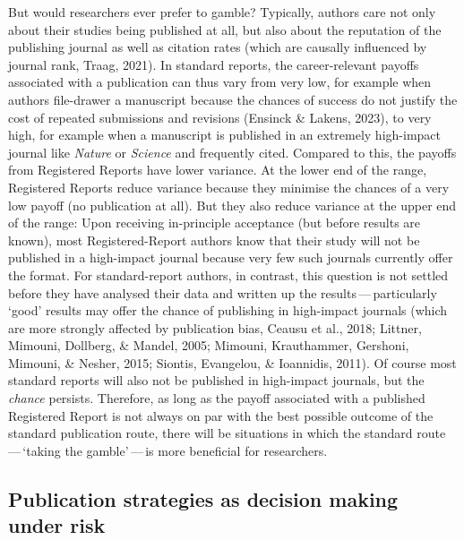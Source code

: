 \documentclass[
  ,man,mask,floatsintext]{apa6}
\begin{document}
But would researchers ever prefer to gamble?
Typically, authors care not only about their studies being published at all, but also about the reputation of the publishing journal as well as citation rates (which are causally influenced by journal rank, Traag, 2021).
In standard reports, the career-relevant payoffs associated with a publication can thus vary from very low, for example when authors file-drawer a manuscript because the chances of success do not justify the cost of repeated submissions and revisions (Ensinck \& Lakens, 2023),
to very high, for example when a manuscript is published in an extremely high-impact journal like \emph{Nature} or \emph{Science} and frequently cited.
Compared to this, the payoffs from Registered Reports have lower variance.
At the lower end of the range, Registered Reports reduce variance because they minimise the chances of a very low payoff (no publication at all).
But they also reduce variance at the upper end of the range:
Upon receiving in-principle acceptance (but before results are known), most Registered-Report authors know that their study will not be published in a high-impact journal because very few such journals currently offer the format.
For standard-report authors, in contrast, this question is not settled before they have analysed their data and written up the results\(\,\)---\(\,\)particularly `good' results may offer the chance of publishing in high-impact journals (which are more strongly affected by publication bias, Ceausu et al., 2018; Littner, Mimouni, Dollberg, \& Mandel, 2005; Mimouni, Krauthammer, Gershoni, Mimouni, \& Nesher, 2015; Siontis, Evangelou, \& Ioannidis, 2011).
Of course most standard reports will also not be published in high-impact journals, but the \emph{chance} persists.
Therefore, as long as the payoff associated with a published Registered Report is not always on par with the best possible outcome of the standard publication route,
there will be situations in which the standard route\(\,\)---\(\,\)`taking the gamble'\(\,\)---\(\,\)is more beneficial for researchers.

\hypertarget{publication-strategies-as-decision-making-under-risk}{%
\subsection{Publication strategies as decision making under risk}\label{publication-strategies-as-decision-making-under-risk}}
\end{document}
